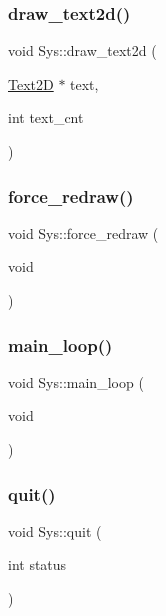 \mbox{\label{classSys_a48a44b17ef0cc797f52e66ff86b0b4ac}} 
\subsubsection{\texorpdfstring{draw\+\_\+text2d()}{draw\_text2d()}}
{\footnotesize\ttfamily void Sys\+::draw\+\_\+text2d (\begin{DoxyParamCaption}\item[{\mbox{\hyperlink{classText2D}{Text2D}} $\ast$}]{text,  }\item[{int}]{text\+\_\+cnt }\end{DoxyParamCaption})}

\mbox{\label{classSys_a2115dba550f339c2faa9585faefd8488}} 
\subsubsection{\texorpdfstring{force\+\_\+redraw()}{force\_redraw()}}
{\footnotesize\ttfamily void Sys\+::force\+\_\+redraw (\begin{DoxyParamCaption}\item[{void}]{ }\end{DoxyParamCaption})}

\mbox{\label{classSys_a6e1bbe5eb1151dca4b61ac6bc43a00fe}} 
\subsubsection{\texorpdfstring{main\+\_\+loop()}{main\_loop()}}
{\footnotesize\ttfamily void Sys\+::main\+\_\+loop (\begin{DoxyParamCaption}\item[{void}]{ }\end{DoxyParamCaption})}

\mbox{\label{classSys_a6afadb6bbb36da0d0fa9ca0f678f7dcb}} 
\subsubsection{\texorpdfstring{quit()}{quit()}}
{\footnotesize\ttfamily void Sys\+::quit (\begin{DoxyParamCaption}\item[{int}]{status }\end{DoxyParamCaption})}

